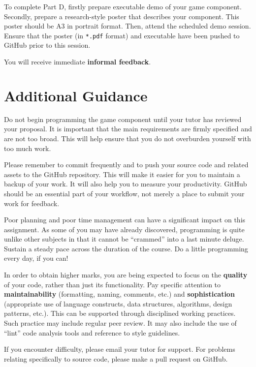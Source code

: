 \documentclass{../fal_assignment}
\begin{document}
To complete Part D, firstly prepare executable demo of your game component. Secondly, prepare a research-style poster that describes your component. This poster should be A3 in portrait format. Then, attend the scheduled demo session. Ensure that the poster (in \texttt{*.pdf} format) and executable have been pushed to GitHub prior to this session.

You will receive immediate \textbf{informal feedback}.

\section*{Additional Guidance}

Do not begin programming the game component until your tutor has reviewed your proposal. It is important that the main requirements are firmly specified and are not too broad. This will help ensure that you do not overburden yourself with too much work. 

Please remember to commit frequently and to push your source code and related assets to the GitHub repository. This will make it easier for you to maintain a backup of your work. It will also help you to measure your productivity. GitHub should be an essential part of your workflow, not merely a place to submit your work for feedback.

Poor planning and poor time management can have a significant impact on this assignment.
As some of you may have already discovered, programming is quite unlike other subjects in that it cannot be ``crammed'' into a last minute deluge. Sustain a steady pace across the duration of the course. Do a little programming every day, if you can!

In order to obtain higher marks, you are being expected to focus on the \textbf{quality} of your code, rather than just its functionality. Pay specific attention to \textbf{maintainability} (formatting, naming, comments, etc.) and \textbf{sophistication} (appropriate use of language constructs, data structures, algorithms, design patterns, etc.). This can be supported through disciplined working practices. Such practice may include regular peer review. It may also include the use of ``lint'' code analysis tools and reference to style guidelines.

If you encounter difficulty, please email your tutor for support. For problems relating specifically to source code, please make a pull request on GitHub.
\end{document}
